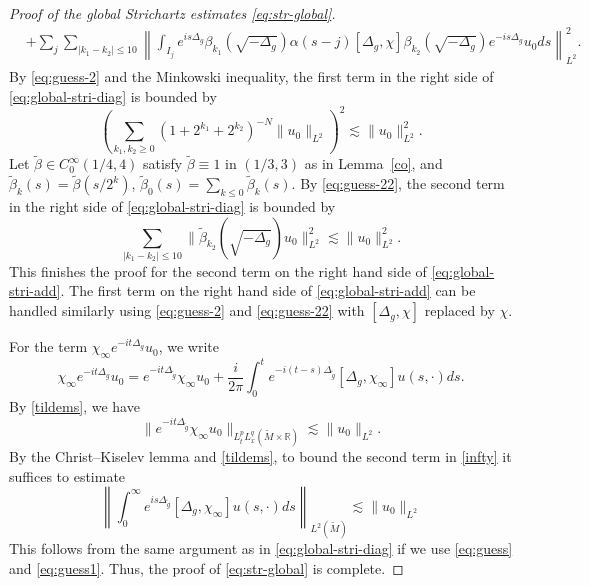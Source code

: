 \documentclass[10pt]{amsart}
\newcommand{\1}{{\bf 1}}
\newcommand{\R}{{\mathbb R}}
\begin{document}
\begin{proof}[Proof of the global Strichartz estimates \eqref{eq:str-global}]
\begin{equation}
\begin{split}
    &+\sum_{j}\sum_{|k_1-k_2|\leq 10}\left\|\int_{I_j} e^{is\Delta_g} \beta_{k_1}(\sqrt{-\Delta_g})\alpha(s-j) [\Delta_g,\chi]\beta_{k_2}(\sqrt{-\Delta_g})e^{-is\Delta_g}u_0 ds\right\|_{L^2}^2.
\end{split}
\end{equation}
By \eqref{eq:guess-2} and the Minkowski inequality, the first term in the right side of \eqref{eq:global-stri-diag} is bounded by
\begin{equation*}
    \left(\sum_{k_1,k_2\ge 0}(1+2^{k_1}+2^{k_2})^{-N}\|u_0\|_{L^2}\right)^2\lesssim \|u_0\|_{L^2}^2.
\end{equation*}
 Let  $\tilde \beta \in C_0^\infty(1/4, 4)$ satisfy $\tilde \beta\equiv 1$ in $(1/3, 3)$ as in Lemma~\ref{co}, 
and $\tilde \beta_k(s)=\tilde \beta(s/2^k)$, $\tilde \beta_0(s) =\sum_{k\leq 0} \tilde \beta_k(s)$. By \eqref{eq:guess-22},  the second term in the right side of \eqref{eq:global-stri-diag} is bounded by
\begin{equation*}
    \sum_{|k_1-k_2|\leq 10} \|\tilde \beta_{k_2}(\sqrt{-\Delta_g})u_0\|_{L^2}^2\lesssim \|u_0\|_{L^2}^2.
\end{equation*}
This finishes the proof for the second term on the right hand side of \eqref{eq:global-stri-add}. The first term on the right hand side of \eqref{eq:global-stri-add} can be handled similarly using \eqref{eq:guess-2} and \eqref{eq:guess-22} with $[\Delta_g,\chi]$ replaced by $\chi$.

For the term $\chi_{\infty}e^{-it\Delta_g} u_0$, we write
\begin{equation}\label{infty}
    \chi_{\infty} e^{-it\Delta_g} u_0 = e^{-it\Delta_{\tilde{g}}} \chi_{\infty} u_0 +\frac{i}{2\pi}\int_0^{t} e^{-i(t-s)\Delta_{\tilde{g}}}[\Delta_g,\chi_{\infty}] u(s,\cdot) ds. 
\end{equation}
By \eqref{tildems}, we have
\begin{equation*}
    \|e^{-it\Delta_{\tilde{g}}}\chi_{\infty} u_0\|_{L_t^pL^q_x(\tilde{M}\times \R)}\lesssim \|u_0\|_{L^2}.
\end{equation*}
By the  Christ--Kiselev lemma and \eqref{tildems}, to bound the second term in \eqref{infty} it suffices to estimate
\begin{equation*}
    \left\|\int_0^\infty e^{is\Delta_{\tilde{g}}}  [\Delta_g,\chi_{\infty}] u(s,\cdot) ds\right\|_{L^2(\tilde{M})} \lesssim \|u_0\|_{L^2}
\end{equation*}
This follows from the same argument as in \eqref{eq:global-stri-diag} if we use \eqref{eq:guess} and  \eqref{eq:guess1}. Thus, the proof of \eqref{eq:str-global} is complete.
\end{proof}
\end{document}
